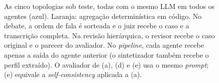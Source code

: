 \documentclass[12pt]{article}
\begin{document}
\begin{figure}[ht]
\caption{As cinco topologias sob teste, todas com o mesmo LLM em todos os agentes (azul). Laranja: agregação determinística em código. No debate, a ordem de fala é sorteada e o juiz recebe o caso e a transcrição completa. Na revisão hierárquica, o revisor recebe o caso original e o parecer do avaliador. No \textit{pipeline}, cada agente recebe apenas a saída do agente anterior (o sintetizador também recebe o perfil extraído). O avaliador de (a), (d) e (e) usa o mesmo \textit{prompt}; (e) equivale a \textit{self-consistency} \citep{wang2023selfconsistency} aplicada a (a).}
\label{fig:topologias}
\end{figure}
\end{document}
